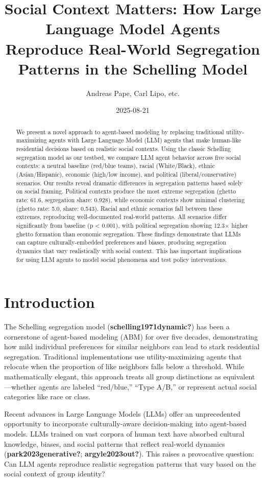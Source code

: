 \documentclass[
  11pt,
]{article}
\title{Social Context Matters: How Large Language Model Agents Reproduce
Real-World Segregation Patterns in the Schelling Model}
\author{Andreas Pape, Carl Lipo, etc.}
\date{2025-08-21}
\begin{document}
\maketitle
\begin{abstract}
We present a novel approach to agent-based modeling by replacing
traditional utility-maximizing agents with Large Language Model (LLM)
agents that make human-like residential decisions based on realistic
social contexts. Using the classic Schelling segregation model as our
testbed, we compare LLM agent behavior across five social contexts: a
neutral baseline (red/blue teams), racial (White/Black), ethnic
(Asian/Hispanic), economic (high/low income), and political
(liberal/conservative) scenarios. Our results reveal dramatic
differences in segregation patterns based solely on social framing.
Political contexts produce the most extreme segregation (ghetto rate:
61.6, segregation share: 0.928), while economic contexts show minimal
clustering (ghetto rate: 5.0, share: 0.543). Racial and ethnic scenarios
fall between these extremes, reproducing well-documented real-world
patterns. All scenarios differ significantly from baseline (p
\textless{} 0.001), with political segregation showing 12.3× higher
ghetto formation than economic segregation. These findings demonstrate
that LLMs can capture culturally-embedded preferences and biases,
producing segregation dynamics that vary realistically with social
context. This has important implications for using LLM agents to model
social phenomena and test policy interventions.
\end{abstract}


\section{Introduction}\label{introduction}

The Schelling segregation model (\textbf{schelling1971dynamic?}) has
been a cornerstone of agent-based modeling (ABM) for over five decades,
demonstrating how mild individual preferences for similar neighbors can
lead to stark residential segregation. Traditional implementations use
utility-maximizing agents that relocate when the proportion of like
neighbors falls below a threshold. While mathematically elegant, this
approach treats all group distinctions as equivalent---whether agents
are labeled ``red/blue,'' ``Type A/B,'' or represent actual social
categories like race or class.

Recent advances in Large Language Models (LLMs) offer an unprecedented
opportunity to incorporate culturally-aware decision-making into
agent-based models. LLMs trained on vast corpora of human text have
absorbed cultural knowledge, biases, and social patterns that reflect
real-world dynamics (\textbf{park2023generative?};
\textbf{argyle2023out?}). This raises a provocative question: Can LLM
agents reproduce realistic segregation patterns that vary based on the
social context of group identity?
\end{document}

